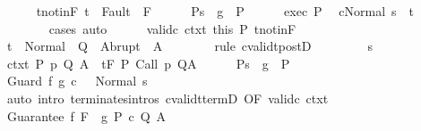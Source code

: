 \begin{isabellebody}
\ \ \ \ \isamarkupfalse%
\ t{\isacharunderscore}notin{\isacharunderscore}F{\isacharcolon}\ {\isachardoublequoteopen}t\ {\isasymnotin}\ Fault\ {\isacharbackquote}\ F{\isachardoublequoteclose}\isanewline
\ \ \ \ \isamarkupfalse%
\ P{\isacharcolon}{\isachardoublequoteopen}s\ {\isasymin}\ {\isacharparenleft}g\ {\isasyminter}\ P{\isacharparenright}{\isachardoublequoteclose}\isanewline
\ \ \ \ \isamarkupfalse%
\ exec\ P\ \isamarkupfalse%
\ {\isachardoublequoteopen}{\isasymGamma}{\isasymturnstile}{\isasymlangle}c{\isacharcomma}Normal\ s{\isasymrangle}\ {\isasymRightarrow}\ t{\isachardoublequoteclose}\isanewline
\ \ \ \ \ \ \isamarkupfalse%
\ cases\ auto\isanewline
\ \ \ \ \isamarkupfalse%
\ valid{\isacharunderscore}c\ ctxt\ this\ P\ t{\isacharunderscore}notin{\isacharunderscore}F\isanewline
\ \ \ \ \isamarkupfalse%
\ {\isachardoublequoteopen}t\ {\isasymin}\ Normal\ {\isacharbackquote}\ Q\ {\isasymunion}\ Abrupt\ {\isacharbackquote}\ A{\isachardoublequoteclose}\isanewline
\ \ \ \ \ \ \isamarkupfalse%
\ {\isacharparenleft}rule\ cvalidt{\isacharunderscore}postD{\isacharparenright}\isanewline
\ \ \isamarkupfalse%
\isanewline
\ \ \ \ \isamarkupfalse%
\ s\isanewline
\ \ \ \ \isamarkupfalse%
\ ctxt{\isacharcolon}\ {\isachardoublequoteopen}{\isasymforall}{\isacharparenleft}P{\isacharcomma}\ p{\isacharcomma}\ Q{\isacharcomma}\ A{\isacharparenright}{\isasymin}{\isasymTheta}{\isachardot}\ {\isasymGamma}\ {\isasymTurnstile}\isactrlsub t\isactrlbsub {\isacharslash}F\isactrlesub \ P\ {\isacharparenleft}Call\ p{\isacharparenright}\ Q{\isacharcomma}A{\isachardoublequoteclose}\isanewline
\ \ \ \ \isamarkupfalse%
\ P{\isacharcolon}{\isachardoublequoteopen}s\ {\isasymin}\ {\isacharparenleft}g\ {\isasyminter}\ P{\isacharparenright}{\isachardoublequoteclose}\isanewline
\ \ \ \ \isamarkupfalse%
\ {\isachardoublequoteopen}{\isasymGamma}{\isasymturnstile}Guard\ f\ g\ c\ \ {\isasymdown}\ Normal\ s{\isachardoublequoteclose}\isanewline
\ \ \ \ \ \ \isamarkupfalse%
\ {\isacharparenleft}auto\ intro{\isacharcolon}\ terminates{\isachardot}intros\ cvalidt{\isacharunderscore}termD\ {\isacharbrackleft}OF\ valid{\isacharunderscore}c\ ctxt{\isacharbrackright}{\isacharparenright}\isanewline
\ \ \isamarkupfalse%
\isanewline
{}\isamarkupfalse%
\isanewline
\ \ \isamarkupfalse%
\ {\isacharparenleft}Guarantee\ f\ F\ {\isasymTheta}\ g\ P\ c\ Q\ A{\isacharparenright}\isanewline

\end{isabellebody}
